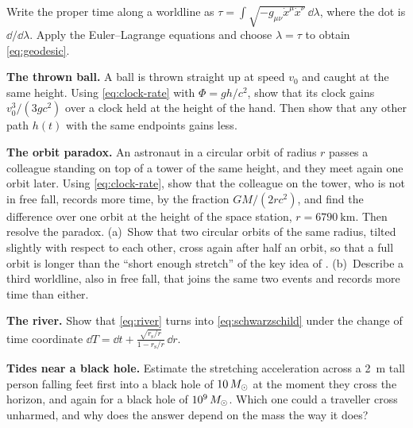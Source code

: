\begin{problems}
  Write the proper time along a worldline as
  $\tau = \int \sqrt{-g_{\mu\nu}\dot x^{\mu}\dot x^{\nu}}\,\dd\lambda$, where the dot
  is $\dd/\dd\lambda$. Apply the Euler--Lagrange equations and choose
  $\lambda = \tau$ to obtain \cref{eq:geodesic}.
\item {}\label{prob:thrown-ball} \textbf{The thrown ball.} A ball is thrown
  straight up at speed $v_{0}$ and caught at the same height. Using
  \cref{eq:clock-rate} with $\Phi = gh/c^{2}$, show that its clock gains
  $v_{0}^{3}/(3gc^{2})$ over a clock held at the height of the hand. Then show that
  any other path $h(t)$ with the same endpoints gains less.
\item {}\label{prob:orbit-paradox} \textbf{The orbit paradox.} An
  astronaut in a circular orbit of radius $r$ passes a colleague standing on
  top of a tower of the same height, and they meet again one orbit later.
  Using \cref{eq:clock-rate}, show that the colleague on the tower, who is not
  in free fall, records more time, by the fraction $GM/(2rc^{2})$, and find the
  difference over one orbit at the height of the space station,
  $r = \SI{6790}{\kilo\metre}$. Then resolve the paradox. (a)~Show that two
  circular orbits of the same radius, tilted slightly with respect to each
  other, cross again after half an orbit, so that a full orbit is longer than
  the \enquote{short enough stretch} of the key idea of
  . (b)~Describe a third worldline, also in free fall,
  that joins the same two events and records more time than either.
\item {} \textbf{The river.} Show that \cref{eq:river} turns into
  \cref{eq:schwarzschild} under the change of time coordinate
  $\dd T = \dd t + \frac{\sqrt{r_{\mathrm{s}}/r}}{1 - r_{\mathrm{s}}/r}\,\dd r$.
\item {} \textbf{Tides near a black hole.} Estimate the stretching
  acceleration across a \SI{2}{\metre} tall person falling feet first into a black
  hole of $10\,M_{\odot}$ at the moment they cross the horizon, and again for a black
  hole of $10^{9}\,M_{\odot}$. Which one could a traveller cross unharmed, and why
  does the answer depend on the mass the way it does?
\end{problems}

